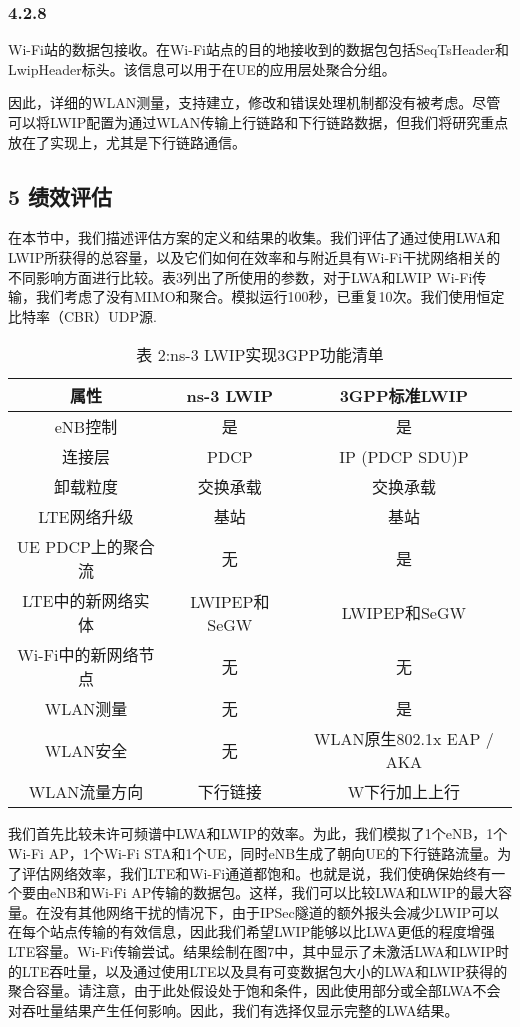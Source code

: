 \subsubsection*{4.2.8}
Wi-Fi站的数据包接收。在Wi-Fi站点的目的地接收到的数据包包括SeqTsHeader和LwipHeader标头。该信息可以用于在UE的应用层处聚合分组。


因此，详细的WLAN测量，支持建立，修改和错误处理机制都没有被考虑。尽管可以将LWIP配置为通过WLAN传输上行链路和下行链路数据，但我们将研究重点放在了实现上，尤其是下行链路通信。

\newpage
\subsection*{5 绩效评估}
在本节中，我们描述评估方案的定义和结果的收集。我们评估了通过使用LWA和LWIP所获得的总容量，以及它们如何在效率和与附近具有Wi-Fi干扰网络相关的不同影响方面进行比较。表3列出了所使用的参数，对于LWA和LWIP Wi-Fi传输，我们考虑了没有MIMO和聚合。模拟运行100秒，已重复10次。我们使用恒定比特率（CBR）UDP源.


\begin{table}
  \centering
  \caption*{表 2:ns-3 LWIP实现3GPP功能清单}
  \begin{tabular}{|c|c|c|}   %
   \hline         %
    属性 & ns-3 LWIP & 3GPP标准LWIP \\
    \hline 
    eNB控制  & 是  & 是 \\
    \hline 
    连接层  & PDCP  & IP (PDCP SDU)P \\
    \hline 
    卸载粒度  & 交换承载  & 交换承载 \\
    \hline 
    LTE网络升级  & 基站  & 基站 \\
    \hline 
    UE PDCP上的聚合流  &  无 & 是 \\
    \hline 
    LTE中的新网络实体 & LWIPEP和SeGW & LWIPEP和SeGW \\
    \hline 
    Wi-Fi中的新网络节点  & 无 & 无 \\
    \hline 
    WLAN测量  & 无 & 是 \\
    \hline 
    WLAN安全 & 无 & WLAN原生802.1x EAP / AKA \\
    \hline 
    WLAN流量方向 & 下行链接 & W下行加上上行 \\
    \hline 
\end{tabular}
\end{table}

我们首先比较未许可频谱中LWA和LWIP的效率。为此，我们模拟了1个eNB，1个Wi-Fi AP，1个Wi-Fi STA和1个UE，同时eNB生成了朝向UE的下行链路流量。为了评估网络效率，我们LTE和Wi-Fi通道都饱和。也就是说，我们使确保始终有一个要由eNB和Wi-Fi AP传输的数据包。这样，我们可以比较LWA和LWIP的最大容量。在没有其他网络干扰的情况下，由于IPSec隧道的额外报头会减少LWIP可以在每个站点传输的有效信息，因此我们希望LWIP能够以比LWA更低的程度增强LTE容量。Wi-Fi传输尝试。结果绘制在图7中，其中显示了未激活LWA和LWIP时的LTE吞吐量，以及通过使用LTE以及具有可变数据包大小的LWA和LWIP获得的聚合容量。请注意，由于此处假设处于饱和条件，因此使用部分或全部LWA不会对吞吐量结果产生任何影响。因此，我们有选择仅显示完整的LWA结果。

